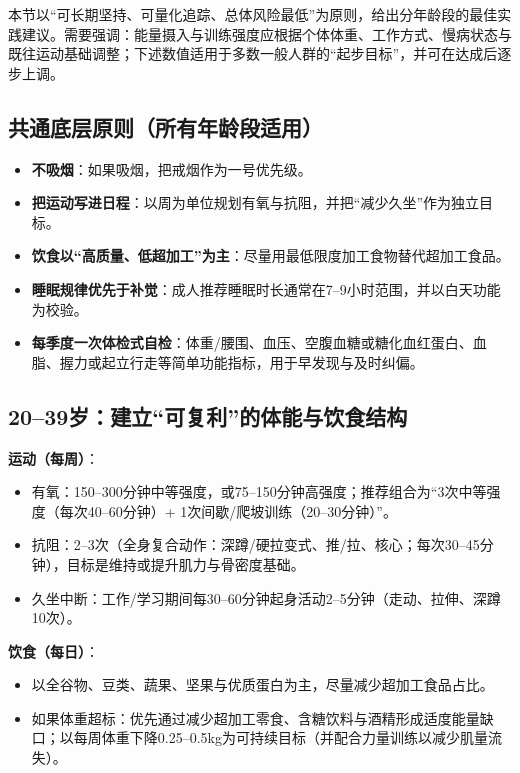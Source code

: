 \documentclass[11pt,a4paper]{article}
\begin{document}
本节以“可长期坚持、可量化追踪、总体风险最低”为原则，给出分年龄段的最佳实践建议。需要强调：能量摄入与训练强度应根据个体体重、工作方式、慢病状态与既往运动基础调整；下述数值适用于多数一般人群的“起步目标”，并可在达成后逐步上调。

\subsection{共通底层原则（所有年龄段适用）}

\begin{itemize}
  \item \textbf{不吸烟}：如果吸烟，把戒烟作为一号优先级\cite{effectsoftobacco2015}。
  \item \textbf{把运动写进日程}：以周为单位规划有氧与抗阻，并把“减少久坐”作为独立目标\cite{sedentarytimeand2022,who2020physicalactivity}。
  \item \textbf{饮食以“高质量、低超加工”为主}：尽量用最低限度加工食物替代超加工食品\cite{ultraprocessedfood2022,doseresponsemeta2023}。
  \item \textbf{睡眠规律优先于补觉}：成人推荐睡眠时长通常在7--9小时范围，并以白天功能为校验\cite{aasm2015sleep}。
  \item \textbf{每季度一次体检式自检}：体重/腰围、血压、空腹血糖或糖化血红蛋白、血脂、握力或起立行走等简单功能指标，用于早发现与及时纠偏\cite{handgripstrengthis2020}。
\end{itemize}

\subsection{20--39岁：建立“可复利”的体能与饮食结构}

\textbf{运动（每周）}：
\begin{itemize}
  \item 有氧：150--300分钟中等强度，或75--150分钟高强度；推荐组合为“3次中等强度（每次40--60分钟）+ 1次间歇/爬坡训练（20--30分钟）”\cite{who2020physicalactivity,pagac2018}。
  \item 抗阻：2--3次（全身复合动作：深蹲/硬拉变式、推/拉、核心；每次30--45分钟），目标是维持或提升肌力与骨密度基础。
  \item 久坐中断：工作/学习期间每30--60分钟起身活动2--5分钟（走动、拉伸、深蹲10次）\cite{sedentarytimeand2022}。
\end{itemize}

\textbf{饮食（每日）}：
\begin{itemize}
  \item 以全谷物、豆类、蔬果、坚果与优质蛋白为主，尽量减少超加工食品占比\cite{plantbasedand2024,ultraprocessedfood2022}。
  \item 如果体重超标：优先通过减少超加工零食、含糖饮料与酒精形成适度能量缺口；以每周体重下降0.25--0.5kg为可持续目标（并配合力量训练以减少肌量流失）\cite{dga2020}。
\end{itemize}
\end{document}
